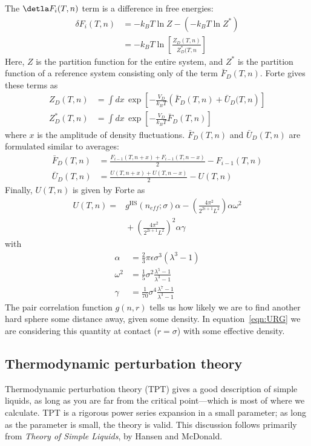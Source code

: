 \documentclass[letterpaper,twocolumn,amsmath,amssymb,prb]{revtex4-1}
\newcommand{\kT}{\ensuremath{k_BT}}
\newcommand{\1}{\ensuremath{\textbf{r}_1}}
\newcommand{\2}{\ensuremath{\textbf{r}_2}}
\newcommand{\3}{\ensuremath{\textbf{r}_3}}
\newcommand{\4}{\ensuremath{\textbf{r}_4}}
\newcommand{\FbarD}{\ensuremath{\bar{F}_D(T,n)}}
\newcommand{\UbarD}{\ensuremath{\bar{U}_D(T,n)}}
\begin{document}
The $\detla F_i(T,n)$ term is a difference in free energies:
\begin{align}
  \delta F_i(T,n) &= -\kT\ln Z - \left( -\kT\ln Z^* \right) \\
  &= -\kT\ln\left[ \frac{Z_D(T,n)}{Z_D^*(T,n} \right]
\end{align}
Here, $Z$ is the partition function for the entire system, and $Z^*$ is the partition function of a reference system consisting only of the term $\FbarD$. Forte gives these terms as
\begin{align}
  Z_D(T,n) &= \int dx\, \exp\left[ -\frac{V_D}{\kT}\left( \FbarD + \bar{U}_D(T,n \right) \right] \\
  Z_D^*(T,n) &= \int dx\, \exp\left[ -\frac{V_D}{\kT}\FbarD \right]
\end{align}
where $x$ is the amplitude of density fluctuations. $\FbarD$ and $\UbarD$ are formulated similar to averages:
\begin{align}
  \FbarD &= \frac{F_{i-1}(T,n+x) + F_{i-1}(T,n-x)}{2} - F_{i-1}(T,n) \\
  \UbarD &= \frac{U(T,n+x) + U(T,n-x)}{2} - U(T,n)
\end{align}
Finally, $U(T,n)$ is given by Forte as
\begin{align}
  U(T,n) = &{} g^\text{HS}(n_{eff};\sigma)\alpha - \left( \frac{4\pi^2}{2^{2i+1}L^2} \right)\alpha\omega^2 \nonumber \\
  &{} + \left( \frac{4\pi^2}{2^{2i+1}L^2} \right)^2\alpha\gamma \label{eqn:URG} %
\end{align}
with
\begin{align}
  \alpha &= \frac{2}{3}\pi\epsilon\sigma^3(\lambda^3 - 1) \\
  \omega^2 &= \frac{1}{5}\sigma^2\frac{\lambda^5 - 1}{\lambda^3 - 1} \\
  \gamma &= \frac{1}{70}\sigma^4\frac{\lambda^7 - 1}{\lambda^3 - 1}
\end{align}
The pair correlation function $g(n,r)$ tells us how likely we are to find another hard sphere some distance away, given some density. In equation~\ref{eqn:URG} we are considering this quantity at contact ($r = \sigma$) with some effective density.

\subsection{Thermodynamic perturbation theory}\label{subsec:TPT}

Thermodynamic perturbation theory (TPT) gives a good description of
simple liquids, as long as you are far from the critical point---which
is most of where we calculate. TPT is a rigorous power series
expansion in a small parameter; as long as the parameter is small, the
theory is valid. This discussion follows primarily from \textit{Theory
  of Simple Liquids}, by Hansen and McDonald\cite{Hansen06}.
\end{document}
